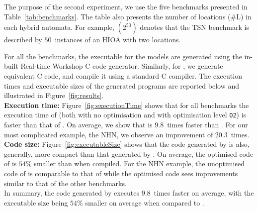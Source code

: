 The purpose of the second experiment, we use the five benchmarks
presented in Table~\ref{tab:benchmarks}.  The table also presents the
number of locations (\#L) in each hybrid automata.  For example,
$(2^{50})$ denotes that the \acf{TSN} benchmark is described by $50$~instances 
of an \ac{HIOA} with two locations.

For all the benchmarks, the executable for the \simulink models are
generated using the in-built Real-time
Workshop\textsuperscript{\textregistered} C code generator.  Similarly,
for \ourTool, we generate equivalent C code, and compile it using a
standard C compiler.
The execution times and executable sizes of the generated programs are reported below and illustrated in Figure~\ref{fig:results}.\\

\textbf{Execution time:} Figure~\ref{fig:executionTime} shows that for
all benchmarks the execution time of \ourTool (both with no optimisation
and with optimisation level \texttt{O2}) is faster than that of
\simulink.  On average, we show that \ourTool is $9.8$~times faster than
\simulink.
For our most complicated example, the \ac{NHN}, we observe an improvement of 
$20.3$~times.\\

\textbf{Code size:} Figure~\ref{fig:executableSize} shows that the code
generated by \ourTool is also, generally, more compact than that
generated by \simulink.  On average, the optimised code of \ourTool is
$54\%$ smaller than \simulink when compiled.
For the \ac{NHN} example, the unoptimised code of \ourTool is comparable to 
that of \simulink while the optimised code sees improvements similar to that of 
the other benchmarks.\\

In summary, the code generated by \ourTool executes $9.8$~times faster
on average, with the executable size being $54\%$ smaller on average
when compared to \simulink.




